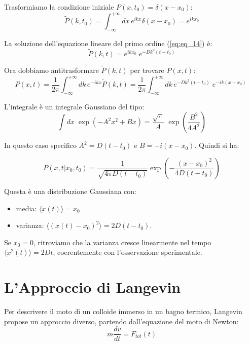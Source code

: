 Trasformiamo la condizione iniziale $P(x,t_0) = \delta(x-x_0)$:
\begin{equation}
\tilde{P}(k, t_0) = \int_{-\infty}^{+\infty} dx \, e^{ikx} \delta(x-x_0) = e^{ikx_0}
\end{equation}

La soluzione dell'equazione lineare del primo ordine (\ref{eq:eq_14}) è:
\begin{equation} 
\tilde{P}(k,t) = e^{ikx_0} \; e^{-D k^2 (t-t_0)}
\end{equation}

Ora dobbiamo antitrasformare $\tilde{P}(k,t)$ per trovare $P(x,t)$:
\begin{equation}
P(x,t) = \frac{1}{2\pi} \int_{-\infty}^{+\infty} dk \, e^{-ikx} \tilde{P}(k,t) = \frac{1}{2\pi} \int_{-\infty}^{+\infty} dk \, e^{-D k^2 (t-t_0)} \; e^{-ik (x-x_0)}  \;
\end{equation}

L'integrale è un integrale Gaussiano del tipo:
\begin{equation} 
\int dx \; \exp (-A^2x^2 + Bx) = \frac{\sqrt{\pi}}{A} \;  \exp \left(\frac{B^2}{4A^2} \right) 
\end{equation}

In questo caso specifico $A^2 = D(t-t_0)$ e $B = -i(x-x_0)$. Quindi si ha:

\begin{tcolorbox}[colback=colorA!5,colframe=colorA, arc=3mm, boxrule=1.2pt]
\begin{equation}
P(x, t | x_0, t_0) = \frac{1}{\sqrt{4\pi D(t-t_0)}} \exp\left( -\frac{(x-x_0)^2}{4D(t-t_0)} \right)
\end{equation}
\end{tcolorbox}

Questa è una distribuzione Gaussiana con:
\begin{itemize}
    \item media:  $\langle x(t) \rangle = x_0$
    \item varianza:  $\langle (x(t)-x_0)^2 \rangle = 2D (t-t_0)$.
\end{itemize}
Se $x_0=0$,  ritroviamo che la varianza cresce linearmente nel tempo $\langle x^2(t) \rangle = 2Dt$, coerentemente con l'osservazione sperimentale.

\section{L'Approccio di Langevin}
Per descrivere il moto di un colloide immerso in un bagno termico, Langevin propose un approccio diverso, partendo dall'equazione del moto di Newton:
\begin{equation}
m \frac{dv}{dt} = F_{tot}(t)
\end{equation}

